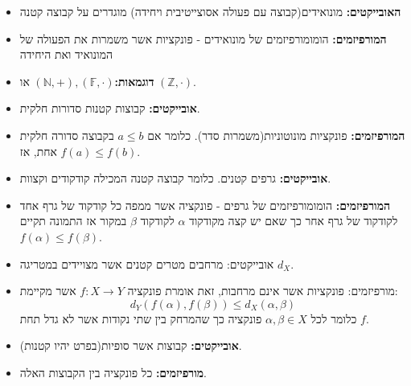 \documentclass{tstextbook}
\begin{document}
\begin{definition}
  \begin{itemize}
    \item \textbf{האובייקטים:} מונואידים(קבוצה עם פעולה אסוצייטיבית ויחידה) מוגדרים על קבוצה קטנה
    \item \textbf{המורפיזמים:} הומומורפיזמים של מונואידים - פונקציות אשר משמרות את הפעולה של המונואיד ואת היחידה
    \item \textbf{דוגמאות:}\((\mathbb{N},+),(\mathbb{F},\cdot)\) או \((\mathbb{Z},\cdot)\).
  \end{itemize}
\end{definition}
\begin{definition}
  \begin{itemize}
    \item \textbf{אובייקטים:} קבוצות קטנות סדורות חלקית.
    \item \textbf{המורפיזמים:} פונקציות מונוטוניות(משמרות סדר). כלומר אם \(a\leq b\) בקבוצה סדורה חלקית אחת, אז \(f(a)\leq f(b)\).
  \end{itemize}
\end{definition}
\begin{definition}
  \begin{itemize}
    \item \textbf{אובייקטים:} גרפים קטנים. כלומר קבוצה קטנה המכילה קודקודים וקצוות.
    \item \textbf{המורפיזמים:} הומומורפיזמים של גרפים - פונקציה אשר ממפה כל קודקוד של גרף אחד לקודקוד של גרף אחר כך שאם יש קצה מקודקוד \(\alpha\) לקודקוד \(\beta\) במקור אז התמונה תקיים \(f(\alpha)\leq f(\beta)\). 
  \end{itemize}
\end{definition}
\begin{definition}
  \begin{itemize}
    \item אובייקטים: מרחבים מטרים קטנים אשר מצויידים במטריגה \(d_{X}\).
    \item מורפיזמים: פונקציות אשר אינם מרחבות, זאת אומרת פונקציה \(f:X\to Y\) אשר מקיימת:
$$d_{Y}(f(\alpha),f(\beta))\leq d_{X}(\alpha,\beta)$$
כלומר לכל \(\alpha,\beta \in X\) פונקציה כך שהמרחק בין שתי נקודות אשר לא גדל תחת \(f\).
  \end{itemize}
\end{definition}
\begin{definition}
  \begin{itemize}
    \item \textbf{אובייקטים:} קבוצות אשר סופיות(בפרט יהיו קטנות).
    \item \textbf{מורפיזמים:} כל פונקציה בין הקבוצות האלה.
  \end{itemize}
\end{definition}
\end{document}
